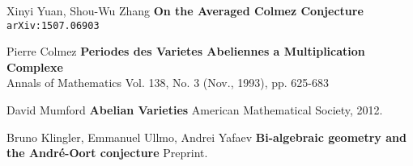 \documentclass[12pt]{article}
\begin{document}
\newpage
{}\selectfont \fontsize{12}{10}\selectfont


\begin{thebibliography}{}

\item Xinyi Yuan, Shou-Wu Zhang \textbf{On the Averaged Colmez Conjecture} \texttt{arXiv:1507.06903}

\item Pierre Colmez \textbf{Periodes des Varietes Abeliennes a Multiplication Complexe} \\ Annals of Mathematics Vol. 138, No. 3 (Nov., 1993), pp. 625-683

\item David Mumford \textbf{Abelian Varieties} American Mathematical Society, 2012.

\item Bruno Klingler, Emmanuel Ullmo, Andrei Yafaev
\textbf{Bi-algebraic geometry and the André-Oort conjecture} Preprint.

\end{thebibliography}
\end{document}
